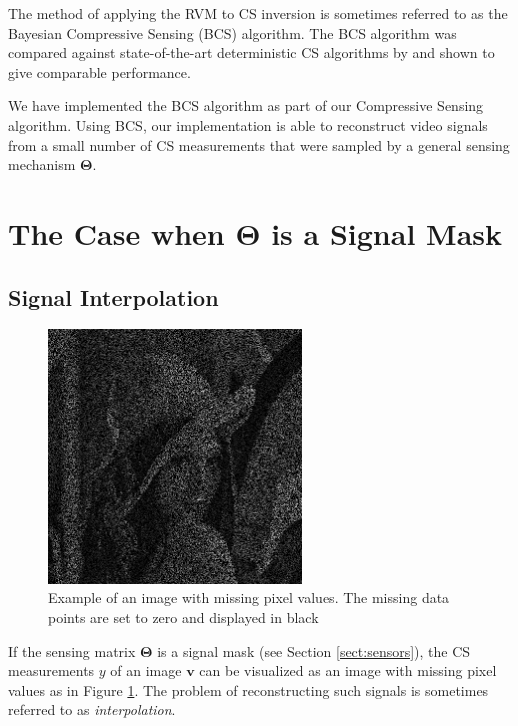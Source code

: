 The method of applying the RVM to CS inversion is sometimes referred to as the Bayesian Compressive Sensing (BCS) algorithm.
The BCS algorithm was compared against state-of-the-art deterministic CS algorithms by \cite{ji2008,pilikos2014} and shown to give comparable performance.

We have implemented the BCS algorithm as part of our Compressive Sensing algorithm.
Using BCS, our implementation is able to reconstruct video signals from a small number of CS measurements that were sampled by a general sensing mechanism $\bm\Theta$. 


\section{The Case when \texorpdfstring{$\bm\Theta$}{[Theta]} is a Signal Mask}

\subsection{Signal Interpolation}
\begin{figure}
  \centering
  \includegraphics[width=0.6\textwidth]{Chapter5/Images/lenna_MASKED.png}
  \caption[Example of masked image signal]{Example of an image with missing pixel values. The missing data points are set to zero and displayed in black}
  \label{fig:lenna_mask}
\end{figure}

If the sensing matrix $\bm\Theta$ is a signal mask (see Section \ref{sect:sensors}), the CS measurements $y$ of an image $\bm v$ can be visualized as an image with missing pixel values as in Figure \ref{fig:lenna_mask}.
The problem of reconstructing such signals is sometimes referred to as \emph{interpolation}.

